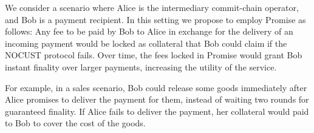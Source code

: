 \documentclass[runningheads]{llncs}
\newcommand{\sys}{Promise\xspace}
\begin{document}
We consider a scenario where Alice is the intermediary commit-chain operator, and Bob is a payment recipient. In this setting we propose to employ \sys as follows: Any fee to be paid by Bob to Alice in exchange for the delivery of an incoming payment would be locked as collateral that Bob could claim if the NOCUST protocol fails. Over time, the fees locked in \sys would grant Bob instant finality over larger payments, increasing the utility of the service.


For example, in a sales scenario, Bob could release some goods immediately after Alice promises to deliver the payment for them, instead of waiting two rounds for guaranteed finality. If Alice fails to deliver the payment, her collateral would paid to Bob to cover the cost of the goods.


\end{document}
